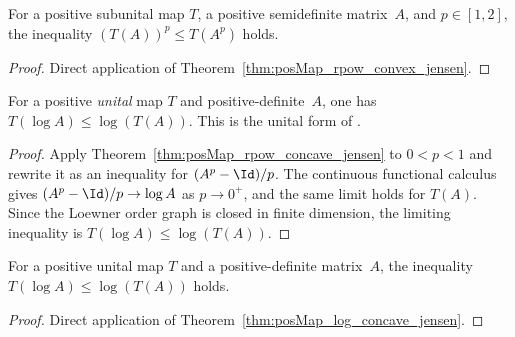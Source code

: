\begin{theorem}\label{thm:rpow_convex_jensen}
    \leanok
    For a positive subunital map $T$, a positive semidefinite matrix~$A$,
    and $p\in[1,2]$, the inequality $(T(A))^p\le T(A^p)$ holds.
\end{theorem}

\begin{proof}\leanok
    Direct application of Theorem~\ref{thm:posMap_rpow_convex_jensen}.
\end{proof}

\begin{theorem}\label{thm:posMap_log_concave_jensen}
    \leanok
    For a positive \emph{unital} map $T$ and positive-definite~$A$, one has
    $T(\log A)\le\log(T(A))$.
    This is the unital form of \cite[Corollary~5.2(3)]{Wolf2012Quantum}.
\end{theorem}

\begin{proof}\leanok
    Apply Theorem~\ref{thm:posMap_rpow_concave_jensen} to $0<p<1$ and rewrite
    it as an inequality for $(A^p-\Id)/p$. The continuous functional calculus
    gives $(A^p-\Id)/p\to\log A$ as $p\to0^+$, and the same limit holds for
    $T(A)$. Since the Loewner order graph is closed in finite dimension, the
    limiting inequality is $T(\log A)\le\log(T(A))$.
\end{proof}

\begin{theorem}\label{thm:log_concave_jensen}
    \leanok
    For a positive unital map $T$ and a positive-definite matrix~$A$,
    the inequality $T(\log A)\le\log(T(A))$ holds.
\end{theorem}

\begin{proof}\leanok
    Direct application of Theorem~\ref{thm:posMap_log_concave_jensen}.
\end{proof}
